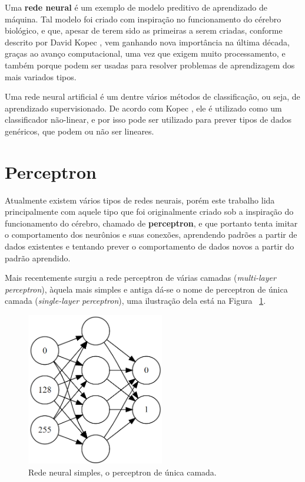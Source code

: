 \documentclass[12pt,brazil]{article}
\newcommand{\defi}[1]{\textbf{#1}}
\newcommand{\eng}[1]{\emph{#1}}
\begin{document}
Uma \defi{rede neural} é um exemplo de modelo preditivo de aprendizado de máquina. Tal modelo foi criado com inspiração no funcionamento do cérebro biológico, e que, apesar de terem sido as primeiras a serem criadas, conforme descrito por David Kopec \citep{classic}, vem ganhando nova importância na última década, graças ao avanço computacional, uma vez que exigem muito processamento, e também porque podem ser usadas para resolver problemas de aprendizagem dos mais variados tipos.

Uma rede neural artificial é um dentre vários métodos de classificação, ou seja, de aprendizado supervisionado. De acordo com Kopec \citep{classic}, ele é utilizado como um classificador não-linear, e por isso pode ser utilizado para prever tipos de dados genéricos, que podem ou não ser lineares.

\section{Perceptron}

Atualmente existem vários tipos de redes neurais, porém este trabalho lida principalmente com aquele tipo que foi originalmente criado sob a inspiração do funcionamento do cérebro, chamado de \defi{perceptron}, e que portanto tenta imitar o comportamento dos neurônios e suas conexões, aprendendo padrões a partir de dados existentes e tentando prever o comportamento de dados novos a partir do padrão aprendido.

Mais recentemente surgiu a rede perceptron de várias camadas (\eng{multi-layer perceptron}), àquela mais simples e antiga dá-se o nome de perceptron de única camada (\eng{single-layer perceptron}), uma ilustração dela está na Figura ~\ref{fig:perceptron}. 

\begin{figure}[htb]
\centering
\includegraphics[width=6cm]{figuras/perceptron}
\caption{\label{fig:perceptron}Rede neural simples, o perceptron de única camada. }
\end{figure}
\end{document}
